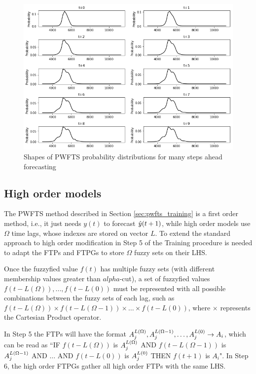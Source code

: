 \begin{figure}[htb]
    \centering
    \includegraphics[width=\textwidth]{figures/pwfts_sample_manystep_tiled.png}
    \caption{Shapes of PWFTS probability distributions for many steps ahead forecasting}
    \label{fig:pwfts_sample_manystep_tiled}
\end{figure}

\subsection{High order models}
\label{sec:pwfts_high_order}

The PWFTS method described in Section \ref{sec:pwfts_training} is a first order method, i.e., it just needs $y(t)$ to forecast $\hat{y}(t+1)$, while high order models use $\Omega$ time lags, whose indexes are stored on vector $L$. To extend the standard approach to high order  modification in Step 5 of the Training procedure is needed to adapt the FTPs and FTPGs to store $\Omega$ fuzzy sets on their LHS.

Once the fuzzyfied value $f(t)$ has multiple fuzzy sets (with different membership values greater than $alpha$-cut), a set of fuzzyfied values $f(t-L(\Omega)),...,f(t-L(0))$ must be represented with all possible combinations between the fuzzy sets of each lag, such as $f(t-L(\Omega)) \times f(t - L(\Omega-1)) \times \ldots \times f(t-L(0))$, where $\times$ represents the Cartesian Product operator. 

In Step 5 the FTPs will have the format $A_j^{L(\Omega)}, A_j^{L(\Omega-1)},\ldots,A_j^{L(0)} \rightarrow A_i$, which can be read as ``IF $f(t-L(\Omega))$ is $A_j^{L(\Omega)}$ AND $f(t-L(\Omega-1))$ is $A_j^{L(\Omega-1)}$ AND $\dots$ AND $f(t-L(0))$ is $A_j^{L(0)}$ THEN $f(t+1)$ is $A_i$". In Step 6, the high order FTPGs gather all high order FTPs with the same LHS. 

